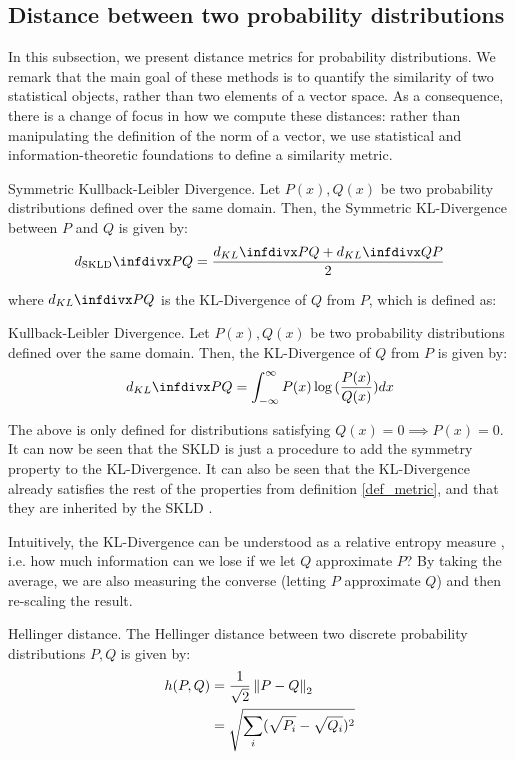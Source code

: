 \documentclass[../main.tex]{subfiles} \label{chapter_soa}
\begin{document}
\subsection{Distance between two probability distributions}\label{subsection_pdfdist}
In this subsection, we present distance metrics for probability distributions. We remark that the main goal of these methods is to quantify the similarity of two statistical objects, rather than two elements of a vector space. As a consequence, there is a change of focus in how we compute these distances: rather than manipulating the definition of the norm of a vector, we use statistical and information-theoretic foundations to define a similarity metric. 
\begin{definition}{Symmetric Kullback-Leibler Divergence.} \label{def_skld1}
Let $P(x), Q(x)$ be two probability distributions defined over the same domain. Then, the Symmetric KL-Divergence between $P$ and $Q$ is given by:
\begin{align*}
d_{\text{SKLD}}\infdiv{P}{Q} = \frac{d_{KL}\infdiv{P}{Q} + d_{KL}\infdiv{Q}{P}}{2}
\end{align*}
\end{definition}
\par where $d_{KL}\infdiv{P}{Q}$ is the KL-Divergence of $Q$ from $P$, which is defined as:
\begin{definition}{Kullback-Leibler Divergence.} \label{def_kld1}
Let $P(x), Q(x)$ be two probability distributions defined over the same domain. Then, the KL-Divergence of $Q$ from $P$ is given by:
\begin{align*}
d_{KL}\infdiv{P}{Q} = \int_{-\infty}^{\infty}P(x)\log{(\frac{P(x)}{Q(x)})}dx
\end{align*}
\end{definition}
\par The above is only defined for distributions satisfying $Q(x) = 0 \implies P(x) = 0$. It can now be seen that the SKLD is just a procedure to add the symmetry property to the KL-Divergence. It can also be seen that the KL-Divergence already satisfies the rest of the properties from definition \ref{def_metric}, and that they are inherited by the SKLD \cite{Hershey2007}. 
\par Intuitively, the KL-Divergence can be understood as a relative entropy measure \cite{Divergence2008}, i.e. how much information can we lose if we let $Q$ approximate $P$? By taking the average, we are also measuring the converse (letting $P$ approximate $Q$) and then re-scaling the result.
\begin{definition}{Hellinger distance.} \label{def_hellinger1}
The Hellinger distance between two discrete probability distributions $P, Q$ is given by:
\begin{align*}
h(P, Q) &= \frac{1}{\sqrt{2}}\left\lVert P-Q\right\rVert_2\\
&= \sqrt{\sum_{i}(\sqrt{P_i}-\sqrt{Q_i})^2}
\end{align*}
\end{definition}
\end{document}
